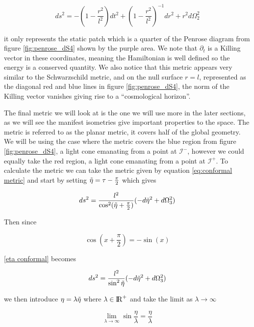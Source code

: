 \documentclass[a4paper,11pt]{article}
\numberwithin{equation}{section}
\numberwithin{figure}{section}
\begin{document}
\begin{large}
\begin{equation}
\label{eq:static metric}
    ds^2=-\left(1-\frac{r^2}{l^2}\right)dt^2+\left(1-\frac{r^2}{l^2}\right)^{-1}dr^2+r^2d\Omega_2^2
\end{equation}


it only represents the static patch which is a quarter of the Penrose diagram from figure \ref{fig:penrose_dS4} shown by the purple area. We note that $\partial_t$ is a Killing vector in these coordinates, meaning the Hamiltonian is well defined so the energy is a conserved quantity. We also notice that this metric appears very similar to the Schwarzschild metric, and on the null surface $r=l$, represented as the diagonal red and blue lines in figure \ref{fig:penrose_dS4}, the norm of the Killing vector vanishes giving rise to a ``cosmological horizon''.
\newline

The final metric we will look at is the one we will use more in the later sections, as we will see the manifest isometries give important properties to the space. The metric is referred to as the planar metric, it covers half of the global geometry. We will be using the case where the metric covers the blue region from figure \ref{fig:penrose_dS4}, a light cone emanating from a point at $\mathcal{I}^-$, however we could equally take the red region, a light cone emanating from  a point at $\mathcal{I}^+$. To calculate the metric we can take the metric given by equation \ref{eq:conformal metric} and start by setting $\Tilde{\eta} = \tau -\frac{\pi}{2}$ which gives

\begin{equation}
\label{eta conformal}
    ds^2=\frac{l^2}{\cos^2(\Tilde{\eta}+\frac{\pi}{2})}(-d\Tilde{\eta}^2+d\Omega^2_3)
\end{equation}

Then since

$$\cos(x+\frac{\pi}{2})=-\sin(x)$$

\ref{eta conformal} becomes

\begin{equation}
\label{eta conformal2}
    ds^2=\frac{l^2}{\sin^2\Tilde{\eta}}(-d\Tilde{\eta}^2+d\Omega^2_3)
\end{equation}

we then introduce $\eta=\lambda\Tilde{\eta}$ where $\lambda \in {\rm I\!R}^+$ and take the limit as $\lambda \rightarrow \infty$

$$\lim_{\lambda\rightarrow\infty}\sin\frac{\eta}{\lambda}=\frac{\eta}{\lambda}$$


\end{large}
\end{document}
